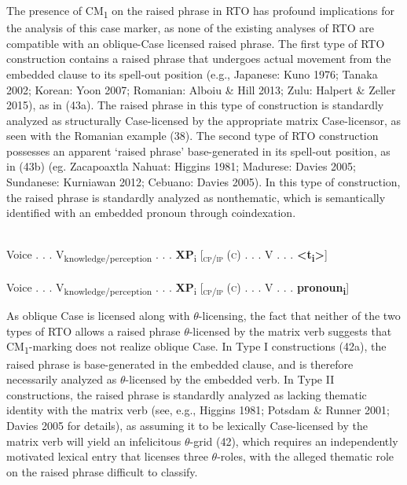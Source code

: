 \documentclass[10pt]{article}
\begin{document}
The presence of CM\textsubscript{1} on the raised phrase in RTO has profound implications for the analysis of this case marker, as none of the existing analyses of RTO are compatible with an oblique-Case licensed raised phrase. The first type of RTO construction contains a raised phrase that undergoes actual movement from the embedded clause to its spell-out position (e.g., Japanese: Kuno 1976; Tanaka 2002; Korean: Yoon 2007; Romanian: Alboiu \& Hill 2013; Zulu: Halpert \& Zeller 2015), as in (43a). The raised phrase in this type of construction is standardly analyzed as structurally Case-licensed by the appropriate matrix Case-licensor, as seen with the Romanian example (38). The second type of RTO construction possesses an apparent `raised phrase' base-generated in its spell-out position, as in (43b) (eg. Zacapoaxtla Nahuat: Higgins 1981; Madurese: Davies 2005; Sundanese: Kurniawan 2012; Cebuano: Davies 2005). In this type of construction, the raised phrase is standardly analyzed as nonthematic, which is semantically identified with an embedded pronoun through coindexation.


\begin{exe}
\begin{xlist}
\vspace{+0.5mm}\\
Voice . . . V\textsubscript{knowledge/perception} . . . \textbf{XP}\textsubscript{i} [\textsc{\textsubscript{cp/ip}} (\textsc{c}) . . . V . . . \textbf{<t\textsubscript{i}>}]\vspace{-1mm}\\
\vspace{+.5mm}\\
Voice . . . V\textsubscript{knowledge/perception} . . . \textbf{XP}\textsubscript{i} [\textsc{\textsubscript{cp/ip}} (\textsc{c}) . . . V . . . \textbf{pronoun{\textsubscript{i}}}]\\
\end{xlist}
\end{exe}


 As oblique Case is licensed along with $\theta$-licensing, the fact that neither of the two types of RTO allows a raised phrase $\theta$-licensed by the matrix verb suggests that CM\textsubscript{1}-marking does not realize oblique Case. In Type I constructions (42a), the raised phrase is base-generated in the embedded clause, and is therefore necessarily analyzed as $\theta$-licensed by the embedded verb. In Type II constructions, the raised phrase is standardly analyzed as lacking thematic identity with the matrix verb (see, e.g., Higgins 1981; Potsdam \& Runner 2001; Davies 2005 for details), as assuming it to be lexically Case-licensed by the matrix verb will yield an infelicitous $\theta$-grid (42), which requires an independently motivated lexical entry that licenses three $\theta$-roles, with the alleged thematic role on the raised phrase difficult to classify. 
\end{document}
